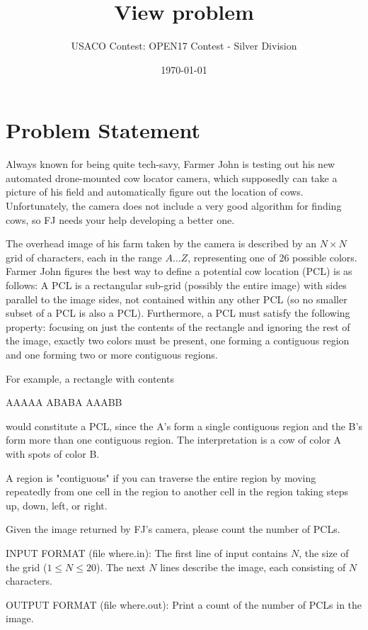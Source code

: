 \documentclass[12pt]{article}
\title{View problem}
\author{USACO Contest: OPEN17 Contest - Silver Division}
\date{\today}
\begin{document}
\maketitle

\section*{Problem Statement}

Always known for being quite tech-savy, Farmer John is testing out his new
automated drone-mounted cow locator camera, which supposedly can take a picture
of his field and automatically figure out the location of cows.  Unfortunately,
the camera does not include a  very good algorithm for finding cows, so FJ needs
your help developing a better one.

The overhead image of his farm taken by the camera is described by an
$N \times N$ grid of characters, each  in the range $A \ldots Z$, representing
one of 26 possible colors.  Farmer John figures the best way to define a
potential cow location (PCL) is as follows: A PCL is a rectangular sub-grid
(possibly the entire image) with sides parallel to the image sides, not
contained within any other PCL (so no smaller subset of a PCL is also a PCL). 
Furthermore, a PCL must satisfy the following property: focusing on just the
contents of the rectangle and ignoring the rest of the image, exactly two colors
must be present, one forming a contiguous region and one forming two or more
contiguous regions.

For example, a rectangle with contents


AAAAA
ABABA
AAABB

would constitute a PCL, since the A's form a single contiguous region and the
B's form more than one contiguous region.  The interpretation is a cow of color
A with spots of color B.  

A region is "contiguous" if you can traverse the entire region by moving
repeatedly from one cell in the region to another cell in the region taking
steps up, down, left, or right.  

Given the image returned by FJ's camera, please count the number of PCLs.

INPUT FORMAT (file where.in):
The first line of input contains $N$, the size of the grid ($1 \leq N \leq 20$).
The next $N$ lines describe the image, each consisting of $N$ characters.

OUTPUT FORMAT (file where.out):
Print a count of the number of PCLs in the image.
\end{document}
